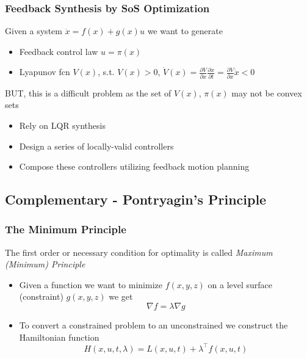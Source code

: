 \documentclass{beamer}
\begin{document}

\begin{frame}
\frametitle{Feedback Synthesis by SoS Optimization}
Given a system $\dot{x} = f(x) + g(x)u$ we want to generate
\begin{itemize}
\item Feedback control law $u=\pi (x)$
\item Lyapunov fcn $V(x)$, s.t.  $V(x)>0$, $\dot{V}(x)=\frac{\partial V}{\partial x}\frac{\partial x}{\partial t}=\frac{\partial V}{\partial x}\dot{x}<0$ 
\end{itemize}\vspace{.5cm}
BUT, this is a difficult problem as the set of $V(x)$, $\pi(x)$ may not be convex sets
\begin{itemize}
\item Rely on LQR synthesis 
\item Design a series of locally-valid controllers 
\item Compose these controllers utilizing feedback motion planning
\end{itemize}
\end{frame}


\subsection{Complementary - Pontryagin's Principle}

\begin{frame}
\frametitle{The Minimum Principle}
The first order or necessary condition for optimality is called \textit{Maximum (Minimum) Principle} 
\begin{itemize}
\item Given a function we want to minimize $f(x,y,z)$ on a level surface (constraint) $g(x,y,z)$ we get
\begin{equation*}
  \nabla f =\lambda \nabla g
\end{equation*} 
\item To convert a constrained problem to an unconstrained we construct the Hamiltonian function 
\begin{equation*}
  H(x,u,t,\lambda )= L(x,u,t)+ \lambda^{\intercal}f(x,u,t)
\end{equation*}   
\end{itemize}
\end{frame}

\end{document}
